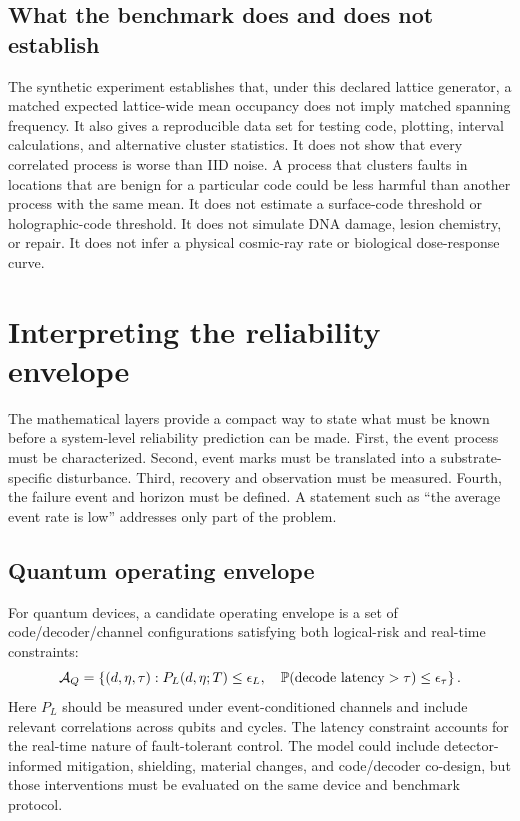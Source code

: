 \documentclass[11pt,a4paper,oneside]{article}
\begin{document}
\subsection{What the benchmark does and does not establish}
The synthetic experiment establishes that, under this declared lattice generator, a matched expected lattice-wide mean occupancy does not imply matched spanning frequency. It also gives a reproducible data set for testing code, plotting, interval calculations, and alternative cluster statistics. It does not show that every correlated process is worse than IID noise. A process that clusters faults in locations that are benign for a particular code could be less harmful than another process with the same mean. It does not estimate a surface-code threshold or holographic-code threshold. It does not simulate DNA damage, lesion chemistry, or repair. It does not infer a physical cosmic-ray rate or biological dose-response curve.

\section{Interpreting the reliability envelope}
\label{sec:translation}
The mathematical layers provide a compact way to state what must be known before a system-level reliability prediction can be made. First, the event process must be characterized. Second, event marks must be translated into a substrate-specific disturbance. Third, recovery and observation must be measured. Fourth, the failure event and horizon must be defined. A statement such as ``the average event rate is low'' addresses only part of the problem.

\subsection{Quantum operating envelope}
For quantum devices, a candidate operating envelope is a set of code/decoder/channel configurations satisfying both logical-risk and real-time constraints:
\begin{equation}\label{eq:quantum-envelope}
\mathcal{A}_Q=\left\{(d,\eta,\tau):P_L(d,\eta;T)\le\epsilon_L,\quad \mathbb{P}(\text{decode latency}>\tau)\le\epsilon_\tau\right\}.
\end{equation}
Here \(P_L\) should be measured under event-conditioned channels and include relevant correlations across qubits and cycles. The latency constraint accounts for the real-time nature of fault-tolerant control. The model could include detector-informed mitigation, shielding, material changes, and code/decoder co-design, but those interventions must be evaluated on the same device and benchmark protocol.
\end{document}
